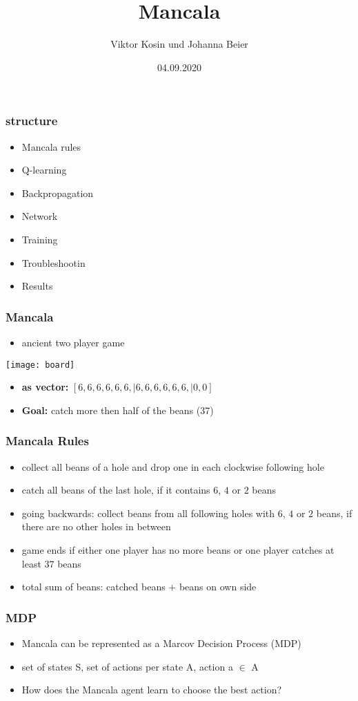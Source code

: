 \documentclass{beamer}
\title{Mancala}
\author{Viktor Kosin und Johanna Beier}
\date{04.09.2020}
\begin{document}
\frame{\titlepage}

\begin{frame}
\frametitle{structure}
\begin{itemize}
\item Mancala rules
\item Q-learning
\item Backpropagation
\item Network
\item Training
\item Troubleshootin
\item Results
\end{itemize}
\end{frame}

\begin{frame}
\frametitle{Mancala}
\begin{itemize}
\item ancient two player game
\end{itemize}
\texttt{[image: board]}
\begin{itemize}
\item \textbf{as vector:} $[6,6,6,6,6,6, | 6,6,6,6,6,6, |0,0]$
\item\textbf{Goal:} catch more then half of the beans (37) 
\end{itemize}
\end{frame}

\begin{frame}
\frametitle{Mancala Rules}
\begin{itemize}
\item collect all beans of a hole and drop one in each clockwise following hole
\item catch all beans of the last hole, if it contains $6$, $4$ or $2$ beans
\item going backwards: collect beans from all following holes with $6$, $4$ or $2$ beans, if there are no other holes in between
\item game ends if either one player has no more beans or one player catches at least $37$ beans
\item total sum of beans: catched beans $+$ beans on own side
\end{itemize}
\end{frame}

\begin{frame}
 \frametitle{MDP}
 \begin{itemize}
 \item Mancala can be represented as a Marcov Decision Process (MDP)
 \item set of states S, set of actions per state A, action a $\in$ A
 \item How does the Mancala agent learn to choose the best action?
 \end{itemize}
 \end{frame}
\end{document}
